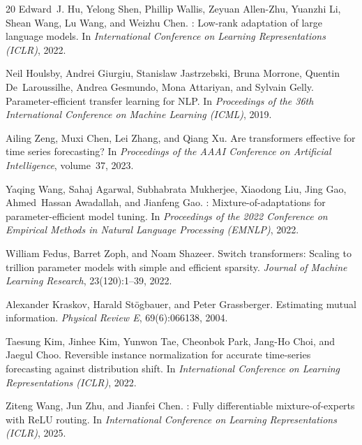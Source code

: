 \documentclass{article}
\begin{document}
\begin{thebibliography}{20}
Edward~J. Hu, Yelong Shen, Phillip Wallis, Zeyuan Allen-Zhu, Yuanzhi Li, Shean Wang, Lu Wang, and Weizhu Chen.
: Low-rank adaptation of large language models.
\newblock In \textit{International Conference on Learning Representations (ICLR)}, 2022.

Neil Houlsby, Andrei Giurgiu, Stanislaw Jastrzebski, Bruna Morrone, Quentin De~Laroussilhe, Andrea Gesmundo, Mona Attariyan, and Sylvain Gelly.
\newblock Parameter-efficient transfer learning for {NLP}.
\newblock In \textit{Proceedings of the 36th International Conference on Machine Learning (ICML)}, 2019.

Ailing Zeng, Muxi Chen, Lei Zhang, and Qiang Xu.
\newblock Are transformers effective for time series forecasting?
\newblock In \textit{Proceedings of the AAAI Conference on Artificial Intelligence}, volume~37, 2023.

Yaqing Wang, Sahaj Agarwal, Subhabrata Mukherjee, Xiaodong Liu, Jing Gao, Ahmed~Hassan Awadallah, and Jianfeng Gao.
: Mixture-of-adaptations for parameter-efficient model tuning.
\newblock In \textit{Proceedings of the 2022 Conference on Empirical Methods in Natural Language Processing (EMNLP)}, 2022.

William Fedus, Barret Zoph, and Noam Shazeer.
\newblock Switch transformers: Scaling to trillion parameter models with simple and efficient sparsity.
\newblock \textit{Journal of Machine Learning Research}, 23(120):1--39, 2022.

Alexander Kraskov, Harald St\"ogbauer, and Peter Grassberger.
\newblock Estimating mutual information.
\newblock \textit{Physical Review E}, 69(6):066138, 2004.

Taesung Kim, Jinhee Kim, Yunwon Tae, Cheonbok Park, Jang-Ho Choi, and Jaegul Choo.
\newblock Reversible instance normalization for accurate time-series forecasting against distribution shift.
\newblock In \textit{International Conference on Learning Representations (ICLR)}, 2022.

Ziteng Wang, Jun Zhu, and Jianfei Chen.
: Fully differentiable mixture-of-experts with ReLU routing.
\newblock In \textit{International Conference on Learning Representations (ICLR)}, 2025.


\end{thebibliography}
\end{document}
